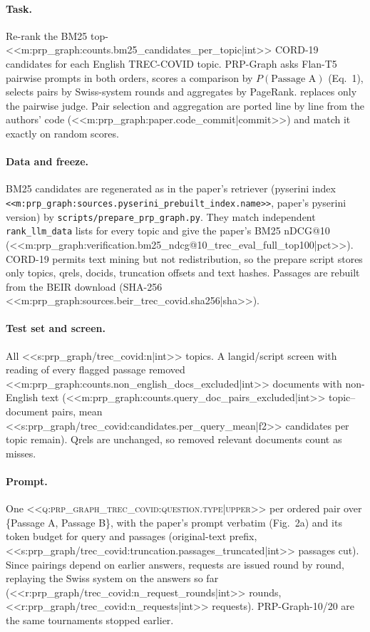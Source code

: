 \paragraph{Task.} Re-rank the BM25 top-<<m:prp_graph:counts.bm25_candidates_per_topic|int>> CORD-19 candidates for each
English TREC-COVID topic. PRP-Graph asks Flan-T5 pairwise prompts in both orders, scores a comparison by
$P(\text{Passage A})$ (Eq.~1), selects pairs by Swiss-system rounds and aggregates by PageRank. \jev{} replaces only
the pairwise judge. Pair selection and aggregation are ported line by line from the authors' code
(<<m:prp_graph:paper.code_commit|commit>>) and match it exactly on random scores.

\paragraph{Data and freeze.} BM25 candidates are regenerated as in the paper's retriever (pyserini index
\texttt{<<m:prp_graph:sources.pyserini_prebuilt_index.name>>}, paper's pyserini version) by
\texttt{scripts/\allowbreak{}prepare\_prp\_graph.py}. They match independent \texttt{rank\_llm\_data} lists for every
topic and give the paper's BM25 nDCG@10 (<<m:prp_graph:verification.bm25_ndcg@10_trec_eval_full_top100|pct>>).
CORD-19 permits text mining but not redistribution, so the prepare script stores only topics, qrels, docids, truncation
offsets and text hashes. Passages are rebuilt from the BEIR download (SHA-256
<<m:prp_graph:sources.beir_trec_covid.sha256|sha>>).

\paragraph{Test set and screen.} All <<s:prp_graph/trec_covid:n|int>> topics. A langid/script screen with
reading of every flagged passage removed <<m:prp_graph:counts.non_english_docs_excluded|int>> documents with
non-English text (<<m:prp_graph:counts.query_doc_pairs_excluded|int>> topic--document pairs, mean
<<s:prp_graph/trec_covid:candidates.per_query_mean|f2>> candidates per topic remain). Qrels are unchanged, so removed
relevant documents count as misses.

\paragraph{Prompt.} One \textsc{<<q:prp_graph_trec_covid:question.type|upper>>} per ordered pair over \{Passage A,
Passage B\}, with the paper's prompt verbatim (Fig.~2a) and its token budget for query and passages (original-text
prefix, <<s:prp_graph/trec_covid:truncation.passages_truncated|int>> passages cut). Since pairings depend on earlier
answers, requests are issued round by round, replaying the Swiss system on the answers so far
(<<r:prp_graph/trec_covid:n_request_rounds|int>> rounds, <<r:prp_graph/trec_covid:n_requests|int>> requests).
PRP-Graph-10/20 are the same tournaments stopped earlier.

